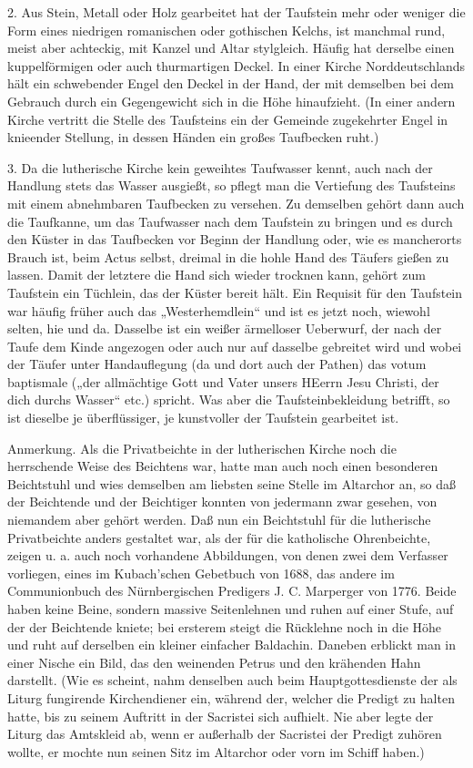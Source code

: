 2. Aus Stein, Metall oder Holz gearbeitet hat der Taufstein mehr oder weniger die Form eines niedrigen romanischen oder gothischen Kelchs, ist manchmal rund, meist aber achteckig, mit Kanzel und Altar stylgleich. Häufig hat derselbe einen kuppelförmigen oder auch thurmartigen Deckel. In einer Kirche Norddeutschlands hält ein schwebender Engel den Deckel in der Hand, der mit demselben bei dem Gebrauch durch ein Gegengewicht sich in die Höhe hinaufzieht. (In einer andern Kirche vertritt die Stelle des Taufsteins ein der Gemeinde zugekehrter Engel in knieender Stellung, in dessen Händen ein großes Taufbecken ruht.)

3. Da die lutherische Kirche kein geweihtes Taufwasser kennt, auch nach der Handlung stets das Wasser ausgießt, so pflegt man die Vertiefung des Taufsteins mit einem abnehmbaren Taufbecken zu versehen. Zu demselben gehört dann auch die Taufkanne, um das Taufwasser nach dem Taufstein zu bringen und es durch den Küster in das Taufbecken vor Beginn der Handlung oder, wie es mancherorts Brauch ist, beim Actus selbst, dreimal in die
hohle Hand des Täufers gießen zu lassen. Damit der letztere die Hand sich wieder trocknen kann, gehört zum Taufstein ein Tüchlein, das der Küster bereit hält. Ein Requisit für den Taufstein war häufig früher auch das „Westerhemdlein“ und ist es jetzt noch, wiewohl selten, hie und da. Dasselbe ist ein weißer ärmelloser Ueberwurf, der nach der Taufe dem Kinde angezogen oder auch nur auf dasselbe gebreitet wird und wobei der Täufer unter Handauflegung (da und dort auch der Pathen) das votum baptismale („der allmächtige Gott und Vater unsers HEerrn Jesu Christi, der dich durchs Wasser“ etc.) spricht. Was aber die Taufsteinbekleidung betrifft, so ist dieselbe je überflüssiger, je kunstvoller der Taufstein gearbeitet ist.

Anmerkung. Als die Privatbeichte in der lutherischen Kirche noch die herrschende Weise des Beichtens war, hatte man auch noch einen besonderen Beichtstuhl und wies demselben am liebsten seine Stelle im Altarchor an, so daß der Beichtende und der Beichtiger konnten von jedermann zwar gesehen, von niemandem aber gehört werden. Daß nun ein Beichtstuhl für die lutherische Privatbeichte anders gestaltet war, als der für die katholische Ohrenbeichte, zeigen u. a. auch noch vorhandene Abbildungen, von denen zwei dem Verfasser vorliegen, eines im Kubach’schen Gebetbuch von 1688, das andere im Communionbuch des Nürnbergischen Predigers J. C. Marperger von 1776. Beide haben keine Beine, sondern massive Seitenlehnen und ruhen auf einer Stufe, auf der der Beichtende kniete; bei ersterem steigt die Rücklehne noch in die Höhe und ruht auf derselben ein kleiner einfacher Baldachin. Daneben erblickt man in einer Nische ein Bild, das den weinenden Petrus und den krähenden Hahn darstellt. (Wie es scheint, nahm denselben auch beim Hauptgottesdienste der als Liturg fungirende Kirchendiener ein, während der, welcher die Predigt zu halten hatte, bis zu seinem Auftritt in der Sacristei sich aufhielt. Nie aber legte der Liturg das Amtskleid ab, wenn er außerhalb der Sacristei der Predigt zuhören wollte, er mochte nun seinen Sitz im Altarchor oder vorn im Schiff haben.)

